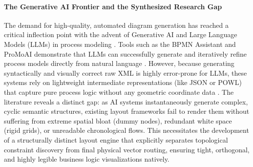 \documentclass{article}
\begin{document}
	\paragraph{The Generative AI Frontier and the Synthesized Research Gap}
	The demand for high-quality, automated diagram generation has reached a critical inflection point with the advent of Generative AI and Large Language Models (LLMs) in process modeling \cite{ref_kourani_llm}. Tools such as the BPMN Assistant and ProMoAI demonstrate that LLMs can successfully generate and iteratively refine process models directly from natural language \cite{ref_licardo, ref_kourani_promoai, ref_nivon}. However, because generating syntactically and visually correct raw XML is highly error-prone for LLMs, these systems rely on lightweight intermediate representations (like JSON or POWL) that capture pure process logic without any geometric coordinate data \cite{ref_licardo, ref_kourani_promoai}. The literature reveals a distinct gap: as AI systems instantaneously generate complex, cyclic semantic structures, existing layout frameworks fail to render them without suffering from extreme spatial bloat (dummy nodes), redundant white space (rigid grids), or unreadable chronological flows. This necessitates the development of a structurally distinct layout engine that explicitly separates topological constraint discovery from final physical vector routing, ensuring tight, orthogonal, and highly legible business logic visualizations natively.
	
\end{document}
